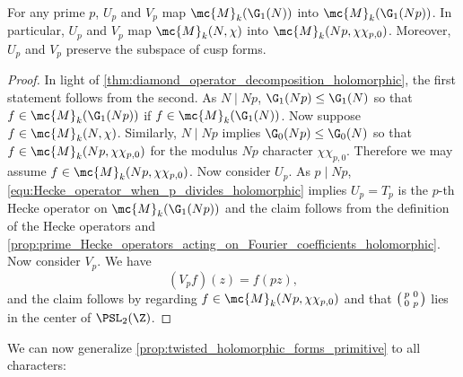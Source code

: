     \begin{lemma}\label{lem:twisted_holomorphic_lemma}
      For any prime $p$, $U_{p}$ and $V_{p}$ map $\mc{M}_{k}(\G_{1}(N))$ into $\mc{M}_{k}(\G_{1}(Np))$. In particular, $U_{p}$ and $V_{p}$ map $\mc{M}_{k}(N,\chi)$ into $\mc{M}_{k}(Np,\chi\chi_{p,0})$. Moreover, $U_{p}$ and $V_{p}$ preserve the subspace of cusp forms.
    \end{lemma}
    \begin{proof}
      In light of \cref{thm:diamond_operator_decomposition_holomorphic}, the first statement follows from the second. As $N \mid Np$, $\G_{1}(Np) \le \G_{1}(N)$ so that $f \in \mc{M}_{k}(\G_{1}(Np))$ if $f \in \mc{M}_{k}(\G_{1}(N))$. Now suppose $f \in \mc{M}_{k}(N,\chi)$. Similarly, $N \mid Np$ implies $\G_{0}(Np) \le \G_{0}(N)$ so that $f \in \mc{M}_{k}(Np,\chi\chi_{p,0})$ for the modulus $Np$ character $\chi\chi_{p,0}$. Therefore we may assume $f \in \mc{M}_{k}(Np,\chi\chi_{p,0})$. Now consider $U_{p}$. As $p \mid Np$, \cref{equ:Hecke_operator_when_p_divides_holomorphic} implies $U_{p} = T_{p}$ is the $p$-th Hecke operator on $\mc{M}_{k}(\G_{1}(Np))$ and the claim follows from the definition of the Hecke operators and \cref{prop:prime_Hecke_operators_acting_on_Fourier_coefficients_holomorphic}. Now consider $V_{p}$. We have
      \[
        (V_{p}f)(z) = f(pz),
      \]
      and the claim follows by regarding $f \in \mc{M}_{k}(Np,\chi\chi_{p,0})$ and that $\begin{psmallmatrix} p & 0 \\ 0 & p \end{psmallmatrix}$ lies in the center of $\PSL_{2}(\Z)$.
    \end{proof}

    We can now generalize \cref{prop:twisted_holomorphic_forms_primitive} to all characters:

